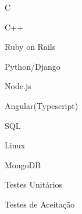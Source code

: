 
        \begin{cvitems}
            \item {C}
            \item {C++}
            \item {Ruby on Rails}
            \item {Python/Django}
            \item {Node.js}
            \item {Angular(Typescript)}
            \item {SQL}
            \item {Linux}
            \item {MongoDB}
            \item {Testes Unitários}
            \item {Testes de Aceitação}
        \end{cvitems}

